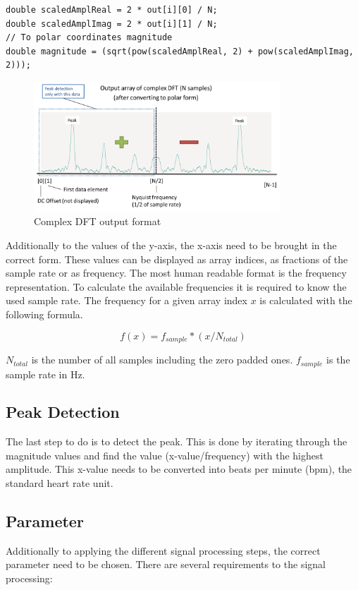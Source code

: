 \documentclass[notitlepage]{scrreprt}
\begin{document}
\begin{lstlisting}[caption=FFT.c]
double scaledAmplReal = 2 * out[i][0] / N;
double scaledAmplImag = 2 * out[i][1] / N;
// To polar coordinates magnitude
double magnitude = (sqrt(pow(scaledAmplReal, 2) + pow(scaledAmplImag, 2)));
\end{lstlisting}

\begin{figure}[H]
	\centering
	\includegraphics[width=350px]{images/outputFormat.png}
	\caption{Complex DFT output format}
	\label{fig:output-format}
\end{figure}

Additionally to the values of the y-axis, the x-axis need to be brought in the correct form. These values can be displayed as array indices, as fractions of the sample rate or as frequency. The most human readable format is the frequency representation. To calculate the available frequencies it is required to know the used sample rate. The frequency for a given array index $x$ is calculated with the following formula.

\begin{equation}
f(x) = f_{sample} * (x / N_{total})
\end{equation}

$N_{total}$ is the number of all samples including the zero padded ones. $f_{sample}$ is the sample rate in Hz.

\subsection{Peak Detection}
The last step to do is to detect the peak. This is done by iterating through the magnitude values and find the value (x-value/frequency) with the highest amplitude. This x-value needs to be converted into beats per minute (bpm), the standard heart rate unit.

\subsection{Parameter}
Additionally to applying the different signal processing steps, the correct parameter need to be chosen. There are several requirements to the signal processing:
\end{document}
